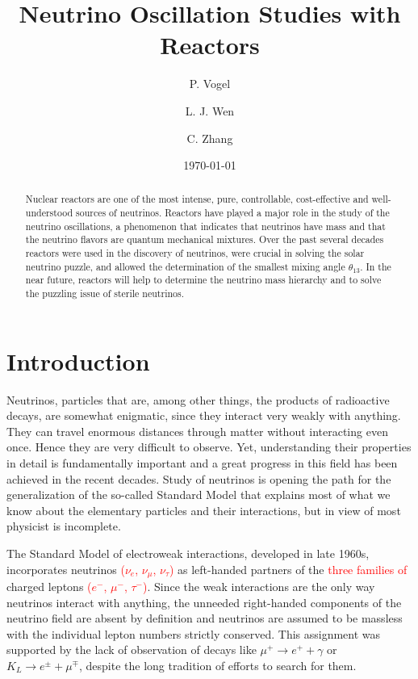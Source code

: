 \documentclass[aps,twocolumn,preprintnumbers,amsmath,superscriptaddress,amssymb,floats,nofootinbib]{revtex4-1}
\begin{document}
\title{Neutrino Oscillation Studies with Reactors}
\date{\today}
\author{P. Vogel}
\author{L. J. Wen}
\author{C. Zhang}


\begin{abstract}
Nuclear reactors are one of the most intense, pure, controllable, cost-effective and well-understood sources of neutrinos. Reactors have played a major role in the study of the neutrino oscillations, a phenomenon that indicates that neutrinos have mass and that the neutrino flavors are quantum mechanical mixtures. Over the past several decades reactors were used in the discovery of neutrinos, were crucial in solving the solar neutrino puzzle, and allowed the determination of the smallest mixing angle $\theta_{13}$. In the near future, reactors will help to determine the neutrino mass hierarchy and to solve the puzzling issue of sterile neutrinos.
\end{abstract}

\maketitle
\thispagestyle{plain}

\section{Introduction} 
\label{sec:intro}
Neutrinos, particles that are, among other things, the products of  radioactive decays, are somewhat enigmatic, since they interact very weakly with anything. 
They can travel enormous distances through matter without interacting even once. 
Hence they are very difficult to observe. 
Yet, understanding their properties in detail is fundamentally important and a great progress in this field has been achieved in the recent decades.   
Study of neutrinos is opening the path for the generalization of the so-called Standard Model that explains most of what we know about the elementary particles and their interactions, but in view of most physicist is incomplete.

The Standard Model of electroweak interactions,
developed in late 1960s, incorporates neutrinos \textcolor{red}{($\nu_e$, $\nu_\mu$, $\nu_\tau$)} as left-handed partners of the \textcolor{red}{three families of} charged leptons \textcolor{red}{($e^-$, $\mu^-$, $\tau^-$)}. Since the weak interactions are the
only way neutrinos  interact with anything, the unneeded right-handed components of the neutrino field are absent 
by definition and neutrinos are assumed to be massless with the individual lepton numbers strictly conserved.
This assignment was supported by the lack of observation of decays like 
$\mu^+ \rightarrow e^+ + \gamma$ or $K_L \rightarrow e^{\pm} + \mu^{\mp}$,
despite the long tradition of efforts to search for them.
\end{document}
